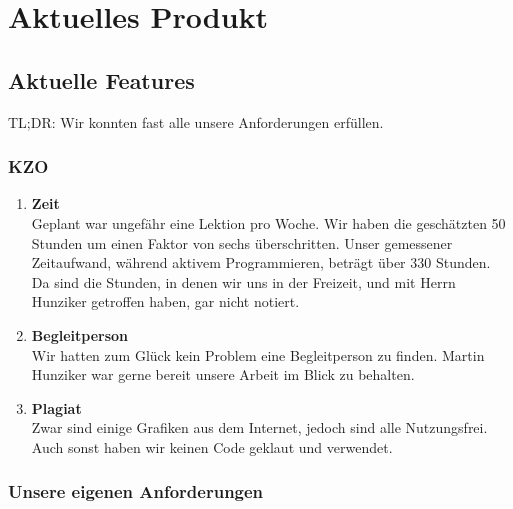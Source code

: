 
\chapter*{Aktuelles Produkt}
\section{Aktuelle Features}
    TL;DR: Wir konnten fast alle unsere Anforderungen erfüllen.

\subsection{KZO}
\begin{enumerate}
    \item \textbf{Zeit} \\
        Geplant war ungefähr eine Lektion pro Woche. Wir haben die geschätzten 50 Stunden um einen Faktor von sechs überschritten. Unser gemessener Zeitaufwand, während aktivem Programmieren,
        beträgt über 330 Stunden. Da sind die Stunden, in denen wir uns in der Freizeit, und mit Herrn Hunziker getroffen haben, gar nicht notiert.
    \item \textbf{Begleitperson} \\
        Wir hatten zum Glück kein Problem eine Begleitperson zu finden. Martin Hunziker war gerne bereit unsere Arbeit im Blick zu behalten.
    \item \textbf{Plagiat} \\
        Zwar sind einige Grafiken aus dem Internet, jedoch sind alle Nutzungsfrei. Auch sonst haben wir keinen Code geklaut und verwendet. 
\end{enumerate}

\subsection{Unsere eigenen Anforderungen}
